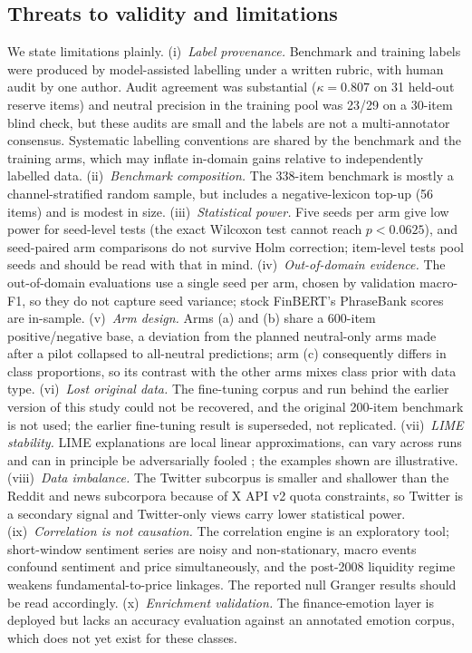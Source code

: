 \documentclass{aims}
\numberwithin{equation}{section}
\begin{document}
\subsection{Threats to validity and limitations}
We state limitations plainly. (i)~\emph{Label provenance.} Benchmark and training
labels were produced by model-assisted labelling under a written rubric, with human
audit by one author. Audit agreement was substantial ($\kappa = 0.807$ on 31
held-out reserve items) and neutral precision in the training pool was 23/29 on a 30-item blind
check, but these audits are small and the labels are not a multi-annotator
consensus. Systematic labelling conventions are shared by the benchmark and the
training arms, which may inflate in-domain gains relative to independently labelled
data. (ii)~\emph{Benchmark composition.} The 338-item benchmark is mostly a
channel-stratified random sample, but includes a negative-lexicon top-up (56 items)
and is modest in size. (iii)~\emph{Statistical power.} Five seeds per arm give low
power for seed-level tests (the exact Wilcoxon test cannot reach $p < 0.0625$), and
seed-paired arm comparisons do not survive Holm correction; item-level tests pool
seeds and should be read with that in mind. (iv)~\emph{Out-of-domain evidence.} The
out-of-domain evaluations use a single seed per arm, chosen by validation macro-F1,
so they do not capture seed variance; stock FinBERT's PhraseBank scores are
in-sample. (v)~\emph{Arm design.} Arms (a) and (b) share a 600-item
positive/negative base, a deviation from the planned neutral-only arms made after a
pilot collapsed to all-neutral predictions; arm (c) consequently differs in class
proportions, so its contrast with the other arms mixes class prior with data type.
(vi)~\emph{Lost original data.} The fine-tuning corpus and run behind the earlier
version of this study could not be recovered, and the original 200-item benchmark
is not used; the earlier fine-tuning result is superseded, not replicated.
(vii)~\emph{LIME stability.} LIME explanations are local linear approximations, can
vary across runs and can in principle be adversarially fooled \citep{slack2020};
the examples shown are illustrative. (viii)~\emph{Data imbalance.} The
Twitter subcorpus is smaller and shallower than the Reddit and news subcorpora
because of X API v2 quota constraints, so Twitter is a secondary signal and
Twitter-only views carry lower statistical power. (ix)~\emph{Correlation is not
causation.} The correlation engine is an exploratory tool; short-window sentiment
series are noisy and non-stationary, macro events confound sentiment and price
simultaneously, and the post-2008 liquidity regime weakens fundamental-to-price
linkages. The reported null Granger results should be read accordingly.
(x)~\emph{Enrichment validation.} The finance-emotion layer is deployed but lacks an
accuracy evaluation against an annotated emotion corpus, which does not yet exist for
these classes.
\end{document}
